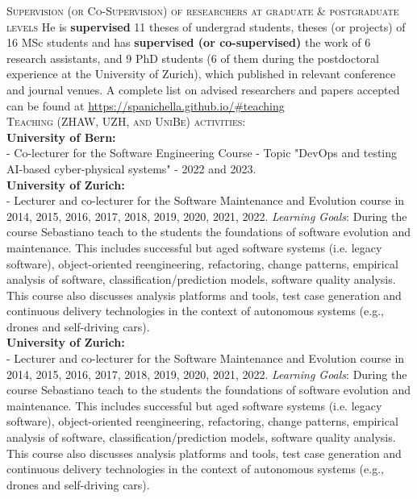 \documentclass[11pt]{article}
\begin{document}
\medskip \medskip
\textsc{Supervision (or Co-Supervision) of researchers at graduate \& postgraduate levels}
\medskip
He is \textbf{supervised} 11 theses of undergrad students, theses (or projects) of 16 MSc students and has \textbf{supervised (or co-supervised)} the work of 6 research assistants, and 9 PhD students (6 of them during the postdoctoral experience at the University of Zurich), which published in relevant conference and journal venues. A complete list on advised researchers and papers accepted can be found at
\href{https://spanichella.github.io/\#teaching}{https://spanichella.github.io/\#teaching}
\medskip \\%
\textsc{Teaching (ZHAW, UZH, and UniBe) activities:}
\medskip \\
\textbf{University of Bern:}
\medskip \\
-   Co-lecturer for the Software Engineering Course - Topic "DevOps and testing AI-based cyber-physical systems" - 2022 and 2023.  
\medskip \\ 
\textbf{University of Zurich:} 
\medskip \\
-   Lecturer and co-lecturer for the Software Maintenance and Evolution course in 2014, 2015, 2016, 2017, 2018, 2019, 2020, 2021, 2022.   \textit{Learning Goals}: During the course Sebastiano teach to
the students the foundations of software evolution and maintenance. This includes successful but aged software systems (i.e. legacy software), object-oriented reengineering, refactoring, change patterns, empirical analysis of software, classification/prediction models, software quality analysis. This course also discusses analysis platforms and tools, test case generation and continuous delivery technologies in the context of autonomous systems (e.g., drones and self-driving cars).
\medskip \\
\textbf{University of Zurich:} 
\medskip \\
-   Lecturer and co-lecturer for the Software Maintenance and Evolution course in 2014, 2015, 2016, 2017, 2018, 2019, 2020, 2021, 2022.   \textit{Learning Goals}: During the course Sebastiano teach to
the students the foundations of software evolution and maintenance. This includes successful but aged software systems (i.e. legacy software), object-oriented reengineering, refactoring, change patterns, empirical analysis of software, classification/prediction models, software quality analysis. This course also discusses analysis platforms and tools, test case generation and continuous delivery technologies in the context of autonomous systems (e.g., drones and self-driving cars).
\end{document}
